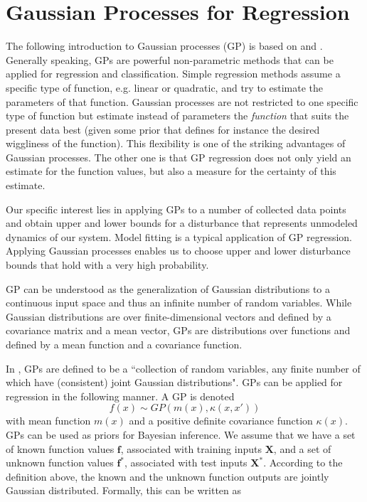 \documentclass[../main.tex]{subfiles}
\begin{document}
\section{Gaussian Processes for Regression}\label{sec:GP}
The following introduction to Gaussian processes (GP) is based on \cite{murphy2012machine} and \cite{rasmussen2006gaussian}. Generally speaking, GPs are powerful non-parametric methods that can be applied for regression and classification. Simple regression methods assume a specific type of function, e.g. linear or quadratic, and try to estimate the parameters of that function. Gaussian processes are not restricted to one specific type of function but estimate instead of parameters the \emph{function} that suits the present data best (given some prior that defines for instance the desired wiggliness of the function). This flexibility is one of the striking advantages of Gaussian processes. The other one is that GP regression does not only yield an estimate for the function values, but also a measure for the certainty of this estimate.
\par
Our specific interest lies in applying GPs to a number of collected data points and obtain upper and lower bounds for a disturbance that represents unmodeled dynamics of our system. Model fitting is a typical application of GP regression. Applying Gaussian processes enables us to choose upper and lower disturbance bounds that hold with a very high probability. \par
GP can be understood as the generalization of Gaussian distributions to a continuous input space and thus an infinite number of random variables. While Gaussian distributions are over finite-dimensional vectors and defined by a covariance matrix and a mean vector, GPs are distributions over functions and defined by a mean function and a covariance function.\par
In \cite{rasmussen2006gaussian}, GPs are defined to be a ``collection of random variables, any finite number of which have (consistent) joint Gaussian distributions". 
GPs can be applied for regression in the following manner. A GP is denoted
\begin{equation}
    f(x) \sim GP(m(x),\kappa(x,x'))
\end{equation}
with mean function $m(x)$ and a positive definite covariance function $\kappa(x)$. GPs can be used as priors for Bayesian inference. We assume that we have a set of known function values $\mathbf{f}$, associated with training inputs $\mathbf{X}$, and a set of unknown function values $\mathbf{f^*}$, associated with test inputs $\mathbf{X^*}$. According to the definition above, the known and the unknown function outputs are jointly Gaussian distributed. Formally, this can be written as
\end{document}
